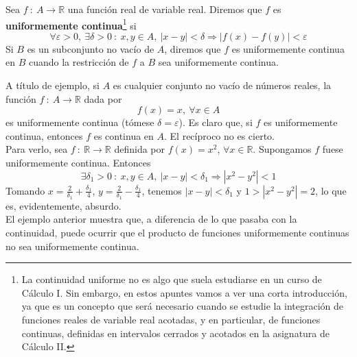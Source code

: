 \begin{definicion}
    Sea $f ~:~ A \longrightarrow \mathbb{R}$ una función real de variable real. Diremos que $f$ es \textbf{uniformemente continua}\footnote{La continuidad uniforme no es algo que suela estudiarse en un curso de Cálculo I.
    Sin embargo, en estos apuntes vamos a ver una corta introducción, ya que es un concepto que será necesario cuando se estudie la integración de funciones reales de variable real acotadas, y en particular, de funciones continuas, definidas en intervalos cerrados y acotados en la asignatura de Cálculo II.}
    si
    \begin{equation*}
        \forall \varepsilon > 0, ~ \exists \delta > 0 ~:~ x,y \in A, ~ |x-y| < \delta \Longrightarrow |f(x)-f(y)| < \varepsilon
    \end{equation*}
    Si $B$ es un subconjunto no vacío de $A$, diremos que $f$ es uniformemente continua en $B$ cuando la restricción de $f$ a $B$
    sea uniformemente continua.
\end{definicion}

A título de ejemplo, si $A$ es cualquier conjunto no vacío de números reales, la función $f ~:~ A \longrightarrow \mathbb{R}$
dada por
\begin{equation*}
    f(x) = x, ~ \forall x \in A
\end{equation*}
es uniformemente continua (tómese $\delta = \varepsilon$). Es claro que, si $f$ es uniformemente continua, entonces $f$ es continua en $A$. El recíproco no es cierto.\\

Para verlo, sea $f ~:~ \mathbb{R} \longrightarrow \mathbb{R}$ definida por $f(x) = x^2$, $\forall x \in \mathbb{R}$.
Supongamos $f$ fuese uniformemente continua. Entonces
\begin{equation*}
    \exists \delta_1 > 0 ~:~ x,y \in A,~ |x-y| < \delta_1 \Longrightarrow |x^2 - y^2| < 1
\end{equation*}
Tomando $x = \frac{2}{\delta_1} + \frac{\delta_1}{4}$, $y = \frac{2}{\delta_1} - \frac{\delta_1}{4}$, tenemos
$|x-y| < \delta_1$ y $1 > |x^2 - y^2| = 2$, lo que es, evidentemente, absurdo.\\

El ejemplo anterior muestra que, a diferencia de lo que pasaba con la continuidad, puede ocurrir que el producto de funciones
uniformemente continuas no sea uniformemente continua.\\

